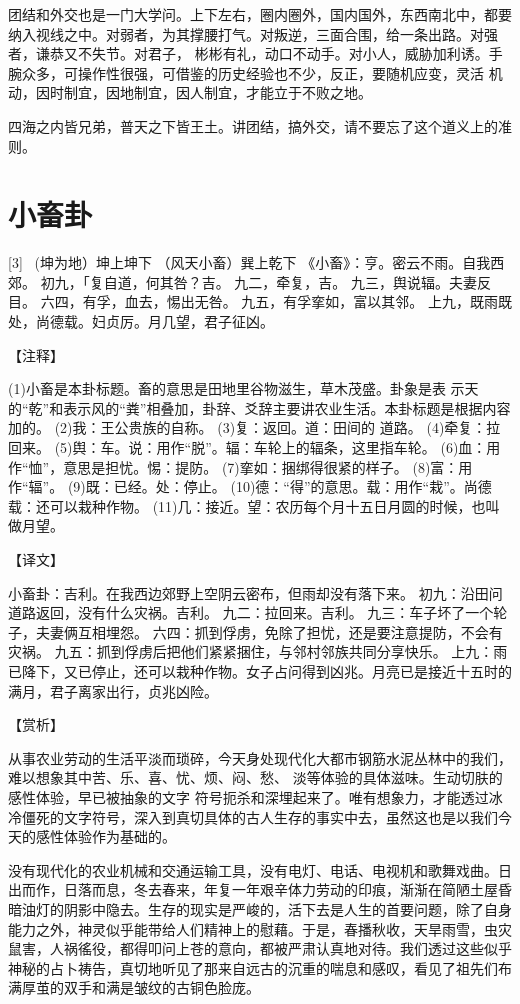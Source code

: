 \documentclass[12pt,UTF8]{ctexbook}
\begin{document}
团结和外交也是一门大学问。上下左右，圈内圈外，国内国外，东西南北中，都要纳入视线之中。对弱者，为其撑腰打气。对叛逆，三面合围，给一条出路。对强者，谦恭又不失节。对君子， 彬彬有礼，动口不动手。对小人，威胁加利诱。手腕众多，可操作性很强，可借鉴的历史经验也不少，反正，要随机应变，灵活 机动，因时制宜，因地制宜，因人制宜，才能立于不败之地。

四海之内皆兄弟，普天之下皆王土。讲团结，搞外交，请不要忘了这个道义上的准则。

\chapter{小畜卦}
[3] \ (坤为地）坤上坤下
（风天小畜）巽上乾下
《小畜》：亨。密云不雨。自我西郊。
初九，「复自道，何其咎？吉。
九二，牵复，吉。
九三，舆说辐。夫妻反目。
六四，有孚，血去，惕出无咎。
九五，有孚挛如，富以其邻。
上九，既雨既处，尚德载。妇贞厉。月几望，君子征凶。

【注释】

(1)小畜是本卦标题。畜的意思是田地里谷物滋生，草木茂盛。卦象是表 示天的“乾”和表示风的“粪”相叠加，卦辞、爻辞主要讲农业生活。本卦标题是根据内容加的。
(2)我：王公贵族的自称。
(3)复：返回。道：田间的 道路。
(4)牵复：拉回来。
(5)舆：车。说：用作“脱”。辐：车轮上的辐条，这里指车轮。
(6)血：用作“恤”，意思是担忧。惕：提防。
(7)挛如：捆绑得很紧的样子。
(8)富：用作“辐”。
(9)既：已经。处：停止。
(10)德：“得”的意思。载：用作“栽”。尚德载：还可以栽种作物。
(11)几：接近。望：农历每个月十五日月圆的时候，也叫做月望。

【译文】

小畜卦：吉利。在我西边郊野上空阴云密布，但雨却没有落下来。
初九：沿田问道路返回，没有什么灾祸。吉利。
九二：拉回来。吉利。
九三：车子坏了一个轮子，夫妻俩互相埋怨。
六四：抓到俘虏，免除了担忧，还是要注意提防，不会有灾祸。
九五：抓到俘虏后把他们紧紧捆住，与邻村邻族共同分享快乐。
上九：雨已降下，又已停止，还可以栽种作物。女子占问得到凶兆。月亮已是接近十五时的满月，君子离家出行，贞兆凶险。

【赏析】

从事农业劳动的生活平淡而琐碎，今天身处现代化大都市钢筋水泥丛林中的我们，难以想象其中苦、乐、喜、忧、烦、闷、愁、 淡等体验的具体滋味。生动切肤的感性体验，早已被抽象的文字 符号扼杀和深埋起来了。唯有想象力，才能透过冰冷僵死的文字符号，深入到真切具体的古人生存的事实中去，虽然这也是以我们今天的感性体验作为基础的。

没有现代化的农业机械和交通运输工具，没有电灯、电话、电视机和歌舞戏曲。日出而作，日落而息，冬去春来，年复一年艰辛体力劳动的印痕，渐渐在简陋土屋昏暗油灯的阴影中隐去。生存的现实是严峻的，活下去是人生的首要问题，除了自身能力之外，神灵似乎能带给人们精神上的慰藉。于是，春播秋收，天旱雨雪，虫灾鼠害，人祸徭役，都得叩问上苍的意向，都被严肃认真地对待。我们透过这些似乎神秘的占卜祷告，真切地听见了那来自远古的沉重的喘息和感叹，看见了祖先们布满厚茧的双手和满是皱纹的古铜色脸庞。
\end{document}
